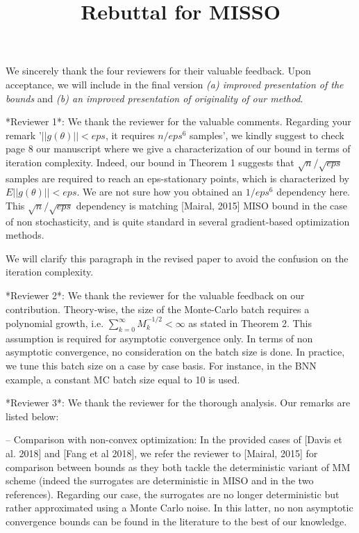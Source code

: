 \documentclass[wcp]{jmlr}
\title[]{Rebuttal for MISSO}
\begin{document}
\maketitle


We sincerely thank the four reviewers for their valuable feedback. 
Upon acceptance, we will include in the final version \emph{{\sf (a)} improved presentation of the bounds} and \emph{{\sf (b)} an improved presentation of originality of our method}. 


\vspace{0.05in}

*Reviewer 1*: We thank the reviewer for the valuable comments.
Regarding your remark '$||g(\theta)||< eps$, it requires $n/eps^6$ samples', we kindly suggest to check page 8 our manuscript where we give a characterization of our bound in terms of iteration complexity. 
Indeed, our bound in Theorem 1 suggests that $\sqrt{n}/\sqrt{eps}$ samples are required to reach an eps-stationary points, which is characterized by $E||g(\theta)||< eps$. 
We are not sure how you obtained an $1/eps^6$ dependency here.
This $\sqrt{n}/\sqrt{eps}$ dependency is matching [Mairal, 2015] MISO bound in the case of non stochasticity, and is quite standard in several gradient-based optimization methods.

We will clarify this paragraph in the revised paper to avoid the confusion on the iteration complexity.



*Reviewer 2*: We thank the reviewer for the valuable feedback on our contribution.
Theory-wise, the size of the Monte-Carlo batch requires a polynomial growth, i.e. $\sum_{k=0}^{\infty}{M_k^{-1/2}} < \infty$ as stated in Theorem 2. This assumption is required for asymptotic convergence only. 
In terms of non asymptotic convergence, no consideration on the batch size is done.
In practice, we tune this batch size on a case by case basis. For instance, in the BNN example, a constant MC batch size equal to 10 is used. 


*Reviewer 3*: We thank the reviewer for the thorough analysis. Our remarks are listed below:

-- Comparison with non-convex optimization: In the provided cases of [Davis et al. 2018] and [Fang et al 2018], we refer the reviewer to [Mairal, 2015] for comparison between bounds as they both tackle the deterministic variant of MM scheme (indeed the surrogates are deterministic in MISO and in the two references).
Regarding our case, the surrogates are no longer deterministic but rather approximated using a Monte Carlo noise. In this latter, no non asymptotic convergence bounds can be found in the literature to the best of our knowledge.
\end{document}
